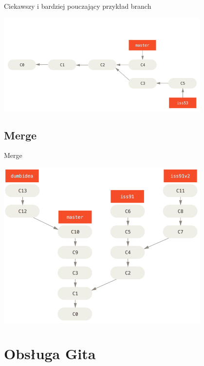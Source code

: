 \documentclass{beamer}
\begin{document}
\begin{frame}
Ciekawszy i bardziej pouczający przykład branch
   \begin{center}
   \includegraphics[width=0.8\textwidth]{./obrazki/fig-3_15.png}
 \end{center}
\end{frame}

\subsection{Merge}
\begin{frame}{Merge}
   \begin{center}
   \includegraphics[width=0.8\textwidth]{./obrazki/fig-3_20.png}
 \end{center}
\end{frame}

\section{Obsługa Gita}
\end{document}
